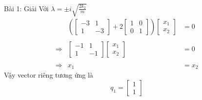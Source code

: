 \begin{frame}{Bài 1: Giải}
    Với \(\displaystyle \lambda= \pm i \sqrt{\frac{2k_2}{m}}\)
    \begin{equation*}
    \begin{array}{crc}
    &
    \left(\left[
    \begin{array}{cc}
    -3 & 1 \\
    1 & -3
    \end{array}
    \right]  +  2
    \left[
    \begin{array}{cc}
        1 & 0 \\
        0 & 1
    \end{array}
    \right]
    \right) \left[
    \begin{array}{c}
    x_1 \\ x_2
    \end{array}\right] &= 0 \\ \\
    \Rightarrow & 
    \left[
    \begin{array}{cc}
        -1 & 1 \\
        1 & -1
    \end{array}
    \right] \left[
    \begin{array}{c}
    x_1 \\
    x_2
    \end{array}\right] &=0 \\ \\
    \Rightarrow & x_1 &= x_2 
    \end{array}
    \end{equation*}
    Vậy vector riêng tương ứng là
    \begin{equation*}
        q_1 = \left[
        \begin{array}{c}
        1 \\
        1
        \end{array}
        \right]
    \end{equation*}
\end{frame}
